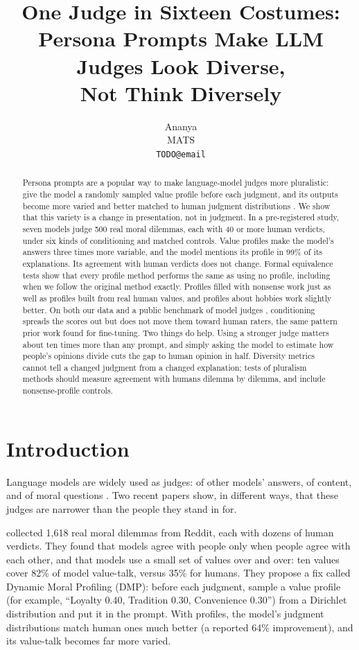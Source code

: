 \documentclass{article}
\title{One Judge in Sixteen Costumes:\\Persona Prompts Make LLM Judges Look Diverse,\\Not Think Diversely}
\author{Ananya\\MATS\\\texttt{TODO@email}}
\begin{document}
\maketitle

\begin{abstract}
Persona prompts are a popular way to make language-model judges more pluralistic: give the model a randomly sampled value profile before each judgment, and its outputs become more varied and better matched to human judgment distributions \citep{russo2026pluralistic}. We show that this variety is a change in presentation, not in judgment. In a pre-registered study, seven models judge 500 real moral dilemmas, each with 40 or more human verdicts, under six kinds of conditioning and matched controls. Value profiles make the model's answers three times more variable, and the model mentions its profile in 99\% of its explanations. Its agreement with human verdicts does not change. Formal equivalence tests show that every profile method performs the same as using no profile, including when we follow the original method exactly. Profiles filled with nonsense work just as well as profiles built from real human values, and profiles about hobbies work slightly better. On both our data and a public benchmark of model judges \citep{mukherjee2026geometry}, conditioning spreads the scores out but does not move them toward human raters, the same pattern prior work found for fine-tuning. Two things do help. Using a stronger judge matters about ten times more than any prompt, and simply asking the model to estimate how people's opinions divide cuts the gap to human opinion in half. Diversity metrics cannot tell a changed judgment from a changed explanation; tests of pluralism methods should measure agreement with humans dilemma by dilemma, and include nonsense-profile controls.
\end{abstract}

\section{Introduction}

Language models are widely used as judges: of other models' answers, of content, and of moral questions \citep{zheng2023judging}. Two recent papers show, in different ways, that these judges are narrower than the people they stand in for.

\citet{russo2026pluralistic} collected 1{,}618 real moral dilemmas from Reddit, each with dozens of human verdicts. They found that models agree with people only when people agree with each other, and that models use a small set of values over and over: ten values cover 82\% of model value-talk, versus 35\% for humans. They propose a fix called Dynamic Moral Profiling (DMP): before each judgment, sample a value profile (for example, ``Loyalty 0.40, Tradition 0.30, Convenience 0.30'') from a Dirichlet distribution and put it in the prompt. With profiles, the model's judgment distributions match human ones much better (a reported 64\% improvement), and its value-talk becomes far more varied.
\end{document}
